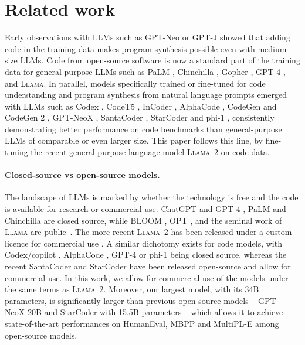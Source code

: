\documentclass[10pt]{article}
\newcommand{\llama}{\textsc{Llama}\xspace}
\newcommand{\llamavtwo}{\textsc{Llama~2}\xspace}
\begin{document}
 \newcommand{\LLM}{LLM\xspace}
\newcommand{\LLMs}{LLMs\xspace}

\section{Related work}\label{sec:relatedwork}
Early observations with \LLMs such as GPT-Neo \citep{gpt-neo} or GPT-J \citep{gpt-j} showed that adding code in the training data makes program synthesis possible even with medium size \LLMs. Code from open-source software is now a standard part of the training data for general-purpose \LLMs such as PaLM \citep{chowdhery2022palm}, Chinchilla \citep{hoffmann2022training}, Gopher \citep{rae2021scaling}, GPT-4 \citep{openai2023gpt4}, and \llama \citep{touvron2023llama,touvron2023llamav2}. In parallel, 
models specifically trained or fine-tuned for code understanding and program synthesis from natural language prompts emerged with \LLMs such as Codex \citep{chen2021evaluating}, CodeT5 \citep{wang2021codet5}, InCoder \citep{fried2022incoder}, AlphaCode \citep{li2022alphacode}, CodeGen \citep{nijkamp2022codegen} and CodeGen 2 \citep{nijkamp2023codegen2}, GPT-NeoX \citep{black2022gpt}, SantaCoder \citep{allal2023santacoder}, StarCoder \citep{li2023starcoder} and phi-1  \citep{gunasekar2023textbooks}, consistently demonstrating better performance on code benchmarks than  general-purpose \LLMs of comparable or even larger size. This paper follows this line, by fine-tuning the recent general-purpose language model \llamavtwo on code data.

\paragraph{Closed-source vs open-source models.} The landscape of \LLMs is marked by whether the technology is free and the code is available for research or commercial use. ChatGPT and GPT-4 \citep{openai2023gpt4}, PaLM \citep{chowdhery2022palm} and Chinchilla \citep{hoffmann2022training} are closed source, while BLOOM \citep{scao2022bloom}, OPT \citep{zhang2022opt}, and the seminal work of \llama are public~\citep{touvron2023llama}. The more recent \llamavtwo has been released under a custom licence for commercial use \citep{touvron2023llamav2}. A similar dichotomy exists for code models, with Codex/copilot \citep{chen2021evaluating}, AlphaCode \citep{li2022alphacode}, GPT-4 or phi-1 \citep{gunasekar2023textbooks} being closed source, whereas the recent SantaCoder \citep{allal2023santacoder} and StarCoder \citep{li2023starcoder} have been released open-source and allow for commercial use. In this work, we allow for commercial use of the models under the same terms as \llamavtwo. Moreover, our largest model, with its 34B parameters, is significantly larger than previous open-source models 
 -- GPT-NeoX-20B \citep{black2022gpt} and StarCoder with 15.5B parameters -- which allows it to achieve state-of-the-art performances on HumanEval, MBPP and MultiPL-E among open-source models. 
\end{document}

